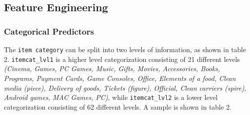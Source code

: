 \documentclass[floatsintext,man]{apa6}
\theoremstyle{definition}
\theoremstyle{definition}
\theoremstyle{definition}
\theoremstyle{remark}
\begin{document}
\begin{table}[H]

\caption{\label{tab:unnamed-chunk-1}Sample Items}
\centering
{}
\end{table}

\subsection{Feature Engineering}\label{feature-engineering}

\subsubsection{Categorical Predictors}\label{categorical-predictors}

The \texttt{item\ category} can be split into two levels of information,
as shown in table 2. \texttt{itemcat\_lvl1} is a higher level
categorization consisting of 21 different levels \emph{(Cinema, Games,
PC Games, Music, Gifts, Movies, Accessories, Books, Programs, Payment
Cards, Game Consoles, Office, Elements of a food, Clean media (piece),
Delivery of goods, Tickets (figure), Official, Clean carriers (spire),
Android games, MAC Games, PC)}, while \texttt{itemcat\_lvl2} is a lower
level categorization consisting of 62 different levels. A sample is
shown in table 2.

\begin{table}[H]

\caption{\label{tab:unnamed-chunk-2}Sample Item Categories}
\centering
{}
\end{table}
\end{document}
